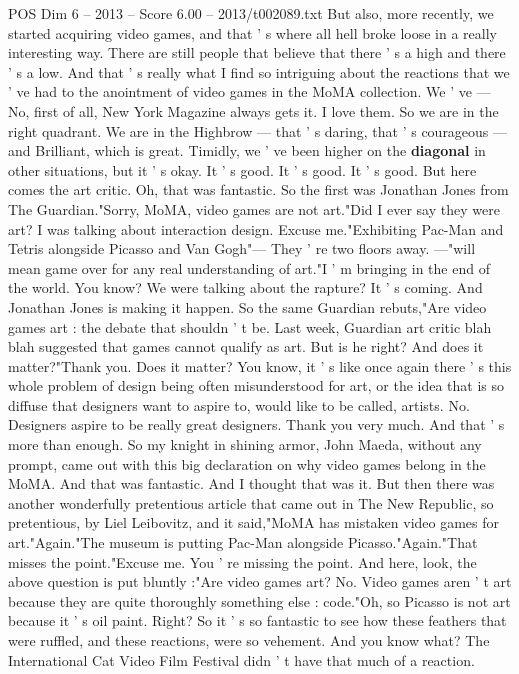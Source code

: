 \begin{textsample}{POS Dim 6 – 2013 – Score 6.00 – 2013/t002089.txt}
But also, more recently, we started acquiring video games, and that ' s where all hell broke loose in a really interesting way.
There are still people that believe that there ' s a high and there ' s a low.
And that ' s really what I find so intriguing about the reactions that we ' ve had to the anointment of video games in the MoMA collection.
We ' ve — No, first of all, New York Magazine always gets it.
I love them.
So we are in the right quadrant.
We are in the Highbrow — that ' s daring, that ' s courageous — and Brilliant, which is great.
Timidly, we ' ve been higher on the \textbf{diagonal} in other situations, but it ' s okay.
It ' s good.
It ' s good.
It ' s good.
But here comes the art critic.
Oh, that was fantastic.
So the first was Jonathan Jones from The Guardian."Sorry, MoMA, video games are not art."Did I ever say they were art?
I was talking about interaction design.
Excuse me."Exhibiting Pac-Man and Tetris alongside Picasso and Van Gogh"— They ' re two floors away. —"will mean game over for any real understanding of art."I ' m bringing in the end of the world.
You know?
We were talking about the rapture?
It ' s coming.
And Jonathan Jones is making it happen.
So the same Guardian rebuts,"Are video games art : the debate that shouldn ' t be.
Last week, Guardian art critic blah blah suggested that games cannot qualify as art.
But is he right?
And does it matter?"Thank you.
Does it matter?
You know, it ' s like once again there ' s this whole problem of design being often misunderstood for art, or the idea that is so diffuse that designers want to aspire to, would like to be called, artists.
No.
Designers aspire to be really great designers.
Thank you very much.
And that ' s more than enough.
So my knight in shining armor, John Maeda, without any prompt, came out with this big declaration on why video games belong in the MoMA.
And that was fantastic.
And I thought that was it.
But then there was another wonderfully pretentious article that came out in The New Republic, so pretentious, by Liel Leibovitz, and it said,"MoMA has mistaken video games for art."Again."The museum is putting Pac-Man alongside Picasso."Again."That misses the point."Excuse me.
You ' re missing the point.
And here, look, the above question is put bluntly :"Are video games art?
No.
Video games aren ' t art because they are quite thoroughly something else : code."Oh, so Picasso is not art because it ' s oil paint.
Right?
So it ' s so fantastic to see how these feathers that were ruffled, and these reactions, were so vehement.
And you know what?
The International Cat Video Film Festival didn ' t have that much of a reaction.

\end{textsample}
